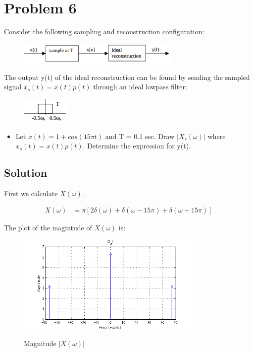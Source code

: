 \section*{Problem 6}

Consider the following sampling and reconstruction configuration:

\begin{figure}[H]
\caption*{}
\centering
\includegraphics[width=0.7\textwidth]{figs/c3p31.png}
\label{fig:c3p31}
\end{figure} 

The output y(t) of the ideal reconstruction can be found by sending the sampled signal 
$x_s(t) = x(t)p(t)$ through an ideal lowpass filter:

\begin{figure}[H]
\caption*{}
\centering
\includegraphics[width=0.2\textwidth]{figs/c3p32.png}
\label{fig:c3p32}
\end{figure} 

\begin{itemize}
\item Let $x(t) = 1 + cos(15\pi t)$ and T = 0.1 sec.
Draw $|X_s(\omega)|$ where $x_s(t) = x(t)p(t)$. 
Determine the expression for y(t).
\end{itemize} 

\subsection*{Solution}

First we calculate $X(\omega)$.

\begin{equation*}
\begin{aligned}
X(\omega) &= \pi [ 2 \delta(\omega) + 
	\delta(\omega - 15\pi) + \delta(\omega + 15 \pi)] 
\end{aligned}
\end{equation*} 

The plot of the magintude of $X(\omega)$ is:

\begin{figure}[H]
\caption{Magnitude $|X(\omega)|$}
\centering
\includegraphics[width=0.8\textwidth]{figs/c3p6a1.png}
\label{fig:c3p6a1}
\end{figure} 

